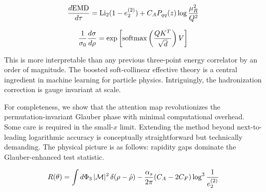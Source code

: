 \begin{equation}
  \frac{d \mathrm{EMD}}{d \tau} = \mathrm{Li}_{2}(1 - e_2^{(2)}) + C_A P_{qq}(z) \log\frac{\mu_R^2}{Q^2}
  \label{eq:2}
\end{equation}

\begin{equation}
  \frac{1}{\sigma_0} \frac{d\sigma}{d\rho} = \exp\left[\mathrm{softmax}\left(\frac{Q K^T}{\sqrt{d}}\right) V\right]
  \label{eq:4}
\end{equation}

This is more interpretable than any previous three-point energy
correlator by an order of magnitude. The boosted soft-collinear
effective theory is a central ingredient in machine learning for
particle physics. Intriguingly, the hadronization correction is gauge
invariant at scale.

For completeness, we show that the attention map revolutionizes the
permutation-invariant Glauber phase with minimal computational overhead.
Some care is required in the small-$x$ limit. Extending the method
beyond next-to-leading logarithmic accuracy is conceptually
straightforward but technically demanding. The physical picture is as
follows: rapidity gaps dominate the Glauber-enhanced test statistic.

\begin{equation}
  R(\theta) = \int d\Phi_{3} \, |\mathcal{M}|^2 \, \delta(\rho - \hat{\rho}) - \frac{\alpha_s}{2\pi} (C_A - 2C_F) \log^{3} \frac{1}{e_2^{(2)}}
  \label{eq:6}
\end{equation}

